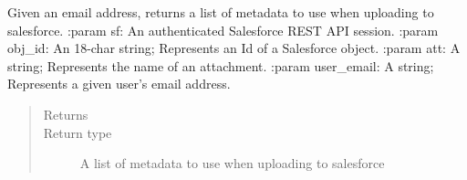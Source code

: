 \documentclass[letterpaper,10pt,english]{sphinxmanual}
\begin{document}
\begin{fulllineitems}
\label{\detokenize{index:ListManagement.utility.sf_helper.cmp_mbr_id_for_contact_id}}
\end{fulllineitems}


\begin{fulllineitems}
\label{\detokenize{index:ListManagement.utility.sf_helper.get_user_id}}
Given an email address, returns a list of metadata to use when uploading to salesforce.
:param sf: An authenticated Salesforce REST API session.
:param obj\_id: An 18-char string; Represents an Id of a Salesforce object.
:param att: A string; Represents the name of an attachment.
:param user\_email: A string; Represents a given user’s email address.
\begin{quote}\begin{description}
\item[{Returns}] \leavevmode


\item[{Return type}] \leavevmode
A list of metadata to use when uploading to salesforce

\end{description}\end{quote}

\end{fulllineitems}

\end{document}
